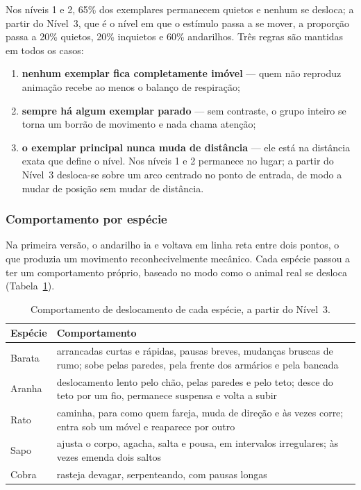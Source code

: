 Nos níveis 1 e 2, 65\% dos exemplares permanecem quietos e nenhum se
desloca; a partir do Nível~3, que é o nível em que o estímulo passa a se
mover, a proporção passa a 20\% quietos, 20\% inquietos e 60\%
andarilhos. Três regras são mantidas em todos os casos:

\begin{enumerate}
  \item \textbf{nenhum exemplar fica completamente imóvel} --- quem não
  reproduz animação recebe ao menos o balanço de respiração;
  \item \textbf{sempre há algum exemplar parado} --- sem contraste, o
  grupo inteiro se torna um borrão de movimento e nada chama atenção;
  \item \textbf{o exemplar principal nunca muda de distância} --- ele
  está na distância exata que define o nível. Nos níveis 1 e 2 permanece
  no lugar; a partir do Nível~3 desloca-se sobre um arco centrado no
  ponto de entrada, de modo a mudar de posição sem mudar de distância.
\end{enumerate}

\subsubsection{Comportamento por espécie}

Na primeira versão, o andarilho ia e voltava em linha reta entre dois
pontos, o que produzia um movimento reconhecivelmente mecânico. Cada
espécie passou a ter um comportamento próprio, baseado no modo como o
animal real se desloca (Tabela~\ref{tab:especies}).

\begin{table}[htbp]
\centering
\caption{Comportamento de deslocamento de cada espécie, a partir do Nível~3.}
\label{tab:especies}
\small
\begin{tabular}{p{1.6cm}p{11.0cm}}
\toprule
\textbf{Espécie} & \textbf{Comportamento} \\
\midrule
Barata & arrancadas curtas e rápidas, pausas breves, mudanças bruscas de
rumo; sobe pelas paredes, pela frente dos armários e pela bancada \\
Aranha & deslocamento lento pelo chão, pelas paredes e pelo teto; desce
do teto por um fio, permanece suspensa e volta a subir \\
Rato & caminha, para como quem fareja, muda de direção e às vezes corre;
entra sob um móvel e reaparece por outro \\
Sapo & ajusta o corpo, agacha, salta e pousa, em intervalos irregulares;
às vezes emenda dois saltos \\
Cobra & rasteja devagar, serpenteando, com pausas longas \\
\bottomrule
\end{tabular}
\end{table}

